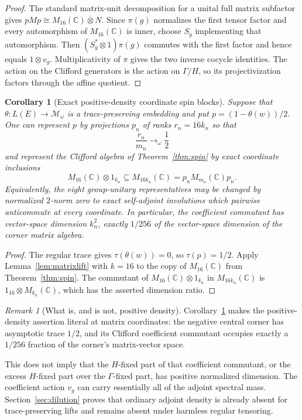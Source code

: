 \documentclass[11pt]{article}
\newtheorem{corollary}[theorem]{Corollary}
\theoremstyle{definition}
\theoremstyle{remark}
\newtheorem{remark}[theorem]{Remark}
\newcommand{\C}{\mathbb C}
\begin{document}
\begin{proof}
The standard matrix-unit decomposition for a unital full matrix subfactor
gives $pMp\cong M_{16}(\C)\bar\otimes N$.  Since $\pi(g)$ normalizes the
first tensor factor and every automorphism of $M_{16}(\C)$ is inner, choose
$S_g$ implementing that automorphism.  Then
$(S_g^*\otimes1)\pi(g)$ commutes with the first factor and hence equals
$1\otimes v_g$.  Multiplicativity of $\pi$ gives the two inverse cocycle
identities.  The action on the Clifford generators is the action on
$\Gamma/H$, so its projectivization factors through the affine quotient.
\end{proof}

\begin{corollary}[Exact positive-density coordinate spin blocks]
\label{cor:coordinatespin}
Suppose that $\theta:L(E)\to\mathcal M_\omega$ is a trace-preserving
embedding and put $p=(1-\theta(w))/2$.  One can represent $p$ by projections
$p_n$ of ranks $r_n=16k_n$ so that
\[
 \frac{r_n}{m_n}\longrightarrow_\omega\frac12
\]
and represent the Clifford algebra of Theorem~\ref{thm:spin} by exact
coordinate inclusions
\[
 M_{16}(\C)\otimes1_{k_n}\subseteq M_{16k_n}(\C)=p_nM_{m_n}(\C)p_n.
\]
Equivalently, the eight group-unitary representatives may be changed by
normalized $2$-norm zero to exact self-adjoint involutions which pairwise
anticommute at every coordinate.
In particular, the coefficient commutant has vector-space dimension $k_n^2$,
exactly $1/256$ of the vector-space dimension of the corner matrix algebra.
\end{corollary}

\begin{proof}
The regular trace gives $\tau(\theta(w))=0$, so $\tau(p)=1/2$.  Apply
Lemma~\ref{lem:matrixlift} with $k=16$ to the copy of $M_{16}(\C)$ from
Theorem~\ref{thm:spin}.  The commutant of
$M_{16}(\C)\otimes1_{k_n}$ in $M_{16k_n}(\C)$ is
$1_{16}\otimes M_{k_n}(\C)$, which has the asserted dimension ratio.
\end{proof}

\begin{remark}[What is, and is not, positive density]\label{rem:density}
Corollary~\ref{cor:coordinatespin} makes the positive-density assertion
literal at matrix coordinates: the negative central corner has asymptotic
trace $1/2$, and its Clifford coefficient commutant occupies exactly a
$1/256$ fraction of the corner's matrix-vector space.

This does not imply that the $H$-fixed part of that coefficient commutant,
or the excess $H$-fixed part over the $\Gamma$-fixed part, has positive
normalized dimension.  The coefficient action $v_g$ can carry essentially
all of the adjoint spectral mass.  Section~\ref{sec:dilution} proves that
ordinary adjoint density is already absent for trace-preserving lifts and
remains absent under harmless regular tensoring.
\end{remark}
\end{document}
